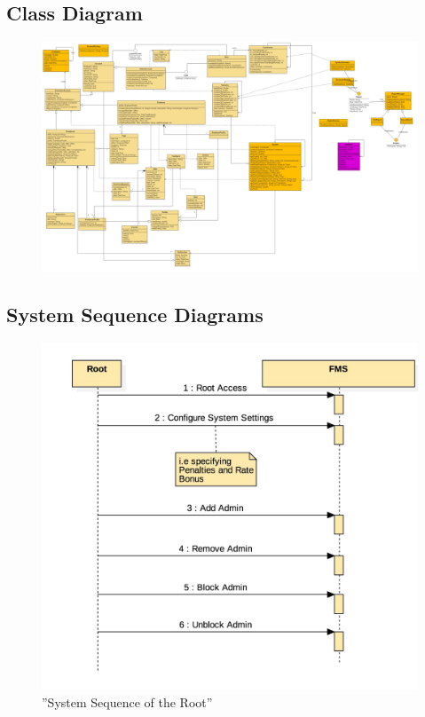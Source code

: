 \documentclass{article}
\begin{document}
\subsection{Class Diagram}
\begin{figure}[ht!]
\centering
\includegraphics[width=128mm]{ClassDiagram_Version1}
\end{figure}





\newpage
\subsection{System Sequence Diagrams}

\begin{figure}[ht!]
\centering
\includegraphics[width=128mm]{SystemSequance_Root}
\caption{''System Sequence of the Root''}
\end{figure}
\end{document}
